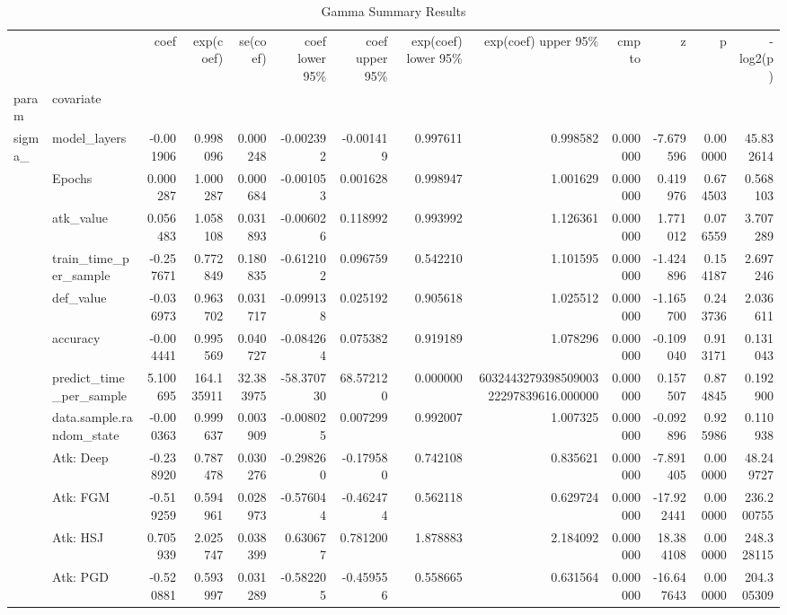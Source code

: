 \begin{table}[htbp]
\caption{Gamma Summary Results}
\label{tab:gamma_summary}
\begin{tabular}{llrrrrrrrrrrr}
\toprule
 &  & coef & exp(coef) & se(coef) & coef lower 95\% & coef upper 95\% & exp(coef) lower 95\% & exp(coef) upper 95\% & cmp to & z & p & -log2(p) \\
param & covariate &  &  &  &  &  &  &  &  &  &  &  \\
\midrule
\multirow[t]{22}{*}{sigma\_} & model\_layers & -0.001906 & 0.998096 & 0.000248 & -0.002392 & -0.001419 & 0.997611 & 0.998582 & 0.000000 & -7.679596 & 0.000000 & 45.832614 \\
 & Epochs & 0.000287 & 1.000287 & 0.000684 & -0.001053 & 0.001628 & 0.998947 & 1.001629 & 0.000000 & 0.419976 & 0.674503 & 0.568103 \\
 & atk\_value & 0.056483 & 1.058108 & 0.031893 & -0.006026 & 0.118992 & 0.993992 & 1.126361 & 0.000000 & 1.771012 & 0.076559 & 3.707289 \\
 & train\_time\_per\_sample & -0.257671 & 0.772849 & 0.180835 & -0.612102 & 0.096759 & 0.542210 & 1.101595 & 0.000000 & -1.424896 & 0.154187 & 2.697246 \\
 & def\_value & -0.036973 & 0.963702 & 0.031717 & -0.099138 & 0.025192 & 0.905618 & 1.025512 & 0.000000 & -1.165700 & 0.243736 & 2.036611 \\
 & accuracy & -0.004441 & 0.995569 & 0.040727 & -0.084264 & 0.075382 & 0.919189 & 1.078296 & 0.000000 & -0.109040 & 0.913171 & 0.131043 \\
 & predict\_time\_per\_sample & 5.100695 & 164.135911 & 32.383975 & -58.370730 & 68.572120 & 0.000000 & 603244327939850900322297839616.000000 & 0.000000 & 0.157507 & 0.874845 & 0.192900 \\
 & data.sample.random\_state & -0.000363 & 0.999637 & 0.003909 & -0.008025 & 0.007299 & 0.992007 & 1.007325 & 0.000000 & -0.092896 & 0.925986 & 0.110938 \\
 & Atk: Deep & -0.238920 & 0.787478 & 0.030276 & -0.298260 & -0.179580 & 0.742108 & 0.835621 & 0.000000 & -7.891405 & 0.000000 & 48.249727 \\
 & Atk: FGM & -0.519259 & 0.594961 & 0.028973 & -0.576044 & -0.462474 & 0.562118 & 0.629724 & 0.000000 & -17.922441 & 0.000000 & 236.200755 \\
 & Atk: HSJ & 0.705939 & 2.025747 & 0.038399 & 0.630677 & 0.781200 & 1.878883 & 2.184092 & 0.000000 & 18.384108 & 0.000000 & 248.328115 \\
 & Atk: PGD & -0.520881 & 0.593997 & 0.031289 & -0.582205 & -0.459556 & 0.558665 & 0.631564 & 0.000000 & -16.647643 & 0.000000 & 204.305309 \\

\end{tabular}
\end{table}
